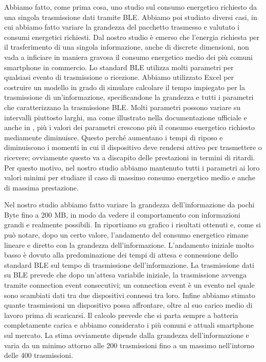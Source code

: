 Abbiamo fatto, come prima cosa, uno studio sul consumo energetico richiesto da una singola trasmissione dati tramite \acs{BLE}. Abbiamo poi studiato diversi casi, in cui abbiamo fatto variare la grandezza del pacchetto trasmesso e valutato i consumi energetici richiesti. Dal nostro studio è emerso che l'energia richiesta per il trasferimento di una singola informazione, anche di discrete dimensioni, non vada a inficiare in maniera gravosa il consumo energetico medio dei più comuni smartphone in commercio.  Lo standard \acs{BLE} utilizza molti parametri per qualsiasi evento di trasmissione o ricezione. Abbiamo utilizzato Excel per costruire un modello in grado di simulare calcolare il tempo impiegato per la trasmissione di un'informazione, specificandone la grandezza e tutti i parametri che caratterizzano la trasmissione \acs{BLE}. Molti parametri possono variare su intervalli piuttosto larghi, ma come illustrato nella documentazione ufficiale \cite{BT-CoreSpec4.0} e anche in \cite{sensor2012}, più i valori dei parametri crescono più il consumo energetico richiesto mediamente diminuisce. Questo perché aumentano i tempi di riposo e diminuiscono i momenti in cui il dispositivo deve rendersi attivo per trasmettere o ricevere; ovviamente questo va a discapito delle prestazioni in termini di ritardi. Per questo motivo, nel nostro studio abbiamo mantenuto tutti i parametri ai loro valori minimi per studiare il caso di massimo consumo energetico medio e anche di massima prestazione.

Nel nostro studio abbiamo fatto variare la grandezza dell'informazione da pochi Byte fino a 200 MB, in modo da vedere il comportamento con informazioni grandi e realmente possibili. In  riportiamo su grafico i risultati ottenuti e, come si può notare, dopo un certo valore, l'andamento del consumo energetico rimane lineare e diretto con la grandezza dell'informazione. L'andamento iniziale molto basso è dovuto alla predominazione dei tempi di attesa e connessione dello standard BLE sul tempo di trasmissione dell'informazione. La trasmissione dati su BLE prevede che dopo un'attesa variabile iniziale, la trasmissione avvenga tramite connection event consecutivi; un connection event è un evento nel quale sono scambiati dati tra due dispositivi connessi tra loro. Infine abbiamo stimato quante trasmissioni un dispositivo possa affrontare, oltre al suo carico medio di lavoro prima di scaricarsi. Il calcolo prevede che si parta sempre a batteria completamente carica e abbiamo considerato i più comuni e attuali smartphone sul mercato. La stima ovviamente dipende dalla grandezza dell'informazione e varia da un minimo attorno alle 200 trasmissioni fino a un massimo nell'intorno delle 400 trasmissioni.

